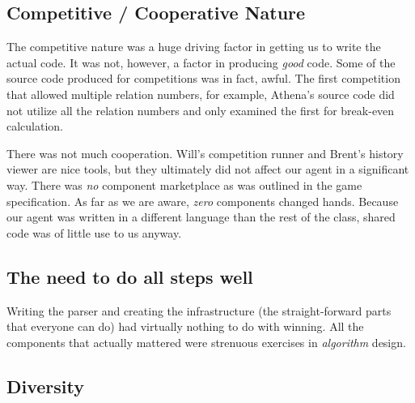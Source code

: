 \documentclass[letterpaper,12pt,oneside]{article}
\begin{document}
\subsection{Competitive / Cooperative Nature}

The competitive nature was a huge driving factor in getting us to write
the actual code. It was not, however, a factor in producing {\em good}
code. Some of the source code produced for competitions was in fact, awful. The
first competition that allowed multiple relation numbers, for example, Athena's
source code did not utilize all the relation numbers and only examined the
first for break-even calculation.

There was not much cooperation. Will's competition runner and Brent's
history viewer are nice tools, but they ultimately did not affect our
agent in a significant way. There was {\em no} component marketplace as was
outlined in the game specification. As far as we are aware, {\em zero}
components changed hands. Because our agent was written in a different language 
than the rest of the class, shared code was of little use to us anyway.

\subsection{The need to do all steps well}

Writing the parser and creating the infrastructure (the straight-forward
parts that everyone can do) had virtually nothing to do with winning. All
the components that actually mattered were strenuous exercises in 
{\em algorithm} design. 

\subsection{Diversity}
% 
\end{document}
